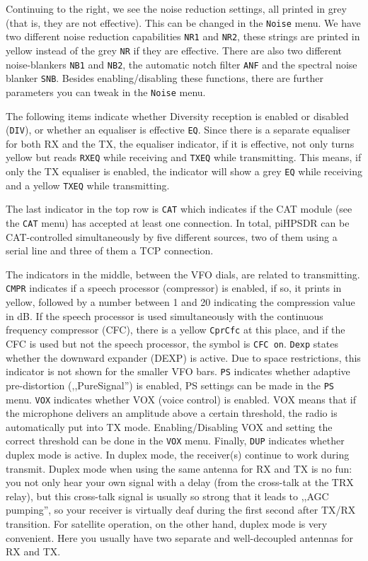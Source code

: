 \documentclass[12pt]{book}
\def\rett#1{\texttt{\color{red}#1}}
\def\bltt#1{\texttt{\color{blue}#1}}
\def\pH{pi\-HPSDR\xspace}
\begin{document}
Continuing to the right, we see the noise reduction settings,
all printed in grey (that is, they are not effective). This
can be changed in the \bltt{Noise} menu. We have two different
noise reduction capabilities \rett{NR1} and \rett{NR2}, these
strings are printed in yellow instead of the grey \rett{NR} if
they are effective. There are also two different noise-blankers
\rett{NB1} and \rett{NB2}, the automatic notch  filter
\rett{ANF} and the spectral  noise blanker \rett{SNB}.
Besides enabling/disabling these functions, there are  further parameters
you can tweak in the \bltt{Noise} menu.

The following items indicate whether Diversity reception is enabled or disabled
(\rett{DIV}), or whether an equaliser is effective \rett{EQ}.
Since there is a separate equaliser for both RX and the TX,
the equaliser indicator, if it is effective, not only turns yellow
but reads \rett{RXEQ} while receiving and \rett{TXEQ} while
transmitting. This means, if only the TX equaliser is enabled,
the indicator will show a  grey \rett{EQ} while receiving
and a yellow \rett{TXEQ}  while  transmitting.

The last indicator in the top row  is \rett{CAT} which indicates
if the CAT module  (see the \bltt{CAT}  menu) has accepted at least
one connection. In total, \pH can be CAT-controlled simultaneously
by five different sources, two of them using a serial line and
three of them a TCP connection.

The indicators in the middle, between the VFO dials, are related to
transmitting. \rett{CMPR} indicates if a speech processor
(compressor) is enabled, if so, it prints in yellow, followed
by a number between 1 and 20 indicating the compression value in dB.
If the speech processor is used simultaneously with the continuous frequency
compressor (CFC), there is a yellow \rett{CprCfc} at this place, and if
the CFC is used but not the speech processor, the symbol is \rett{CFC on}.
\rett{Dexp} states whether the downward expander (DEXP) is active. Due to space
restrictions, this indicator is not shown for the smaller VFO bars.
\rett{PS} indicates whether adaptive pre-distortion (,,PureSignal'')
is enabled, PS settings can be made in the \bltt{PS} menu.
\rett{VOX} indicates whether VOX (voice control) is enabled. VOX means
that if  the microphone delivers an amplitude above a certain threshold,
the radio is automatically put into TX mode. Enabling/Disabling VOX
and setting the correct threshold can be done in the \bltt{VOX} menu.
Finally, \rett{DUP} indicates whether duplex mode is active.
In duplex mode, the receiver(s) continue to work during transmit. Duplex
mode when using the same antenna for RX and TX is  no fun: you not only hear
your own signal with a delay (from the cross-talk at the TRX relay), but
this cross-talk signal is  usually so strong that it leads to ,,AGC pumping'', so
your receiver is virtually deaf during the first second after TX/RX
transition. For satellite operation, on the other hand, duplex  mode
is very convenient. Here you usually have two separate and well-decoupled
antennas for RX and TX.
\end{document}
